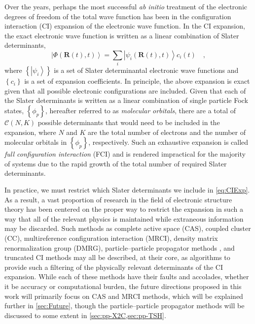 \documentclass[12pt]{article}
\newcommand{\ket}[1]{\left\vert #1 \right\rangle}         %
\newcommand*\vc[1]{\boldsymbol{#1}}
\begin{document}
Over the years, perhaps the most successful \emph{ab initio} treatment of the
electronic degrees of freedom of the total wave function has been in the
configuration interaction (CI) expansion of the electronic wave function. In the
CI expansion, the exact electronic wave function is written as a linear
combination of Slater determinants,
\begin{equation}
\ket{\Phi (\vc{R}(t),t)} = \sum_i  \ket{\psi_i (\vc{R}(t),t)} c_i(t)
\quad ,
\label{eq:CIExp}
\end{equation}
where $\left\lbrace\ket{\psi_i}\right\rbrace$ is a set of Slater determinantal
electronic wave functions and $\left\lbrace c_i \right\rbrace$ is a set of
expansion coefficients.  In principle, the above expansion is exact given that
all possible electronic configurations are included. Given that each of the
Slater determinants is written as a linear combination of single particle Fock
states, $\left\lbrace \phi_p \right\rbrace$, hereafter referred to as
\emph{molecular orbitals}, there are a total of $\mathcal{C}(N,K)$ possible
determinants that would need to be included in the expansion, where $N$ and $K$
are the total number of electrons and the number of molecular orbitals in
$\left\lbrace \phi_p \right\rbrace$, respectively. Such an exhaustive expansion
is called \emph{full configuration interaction} (FCI) and is rendered
impractical for the majority of systems due to the rapid growth of the total
number of required Slater determinants.

In practice, we  must restrict which Slater determinants we include in
\cref{eq:CIExp}. As a result, a vast proportion of research in the field of
electronic structure theory has been centered on the proper way to restrict the
expansion in such a way that all of the relevant physics is maintained while
extraneous information may be discarded. Such methods as complete active space
(CAS), coupled cluster (CC), multireference configuration interaction (MRCI),
density matrix renormalization group (DMRG), particle--particle propagator
methods , and truncated CI methods may all be described, at their core, as
algorithms to provide such a filtering of the physically relevant determinants
of the CI expansion. While each of these methods have their faults and
accolades, whether it be accuracy or computational burden, the future
directions proposed in this work will primarily focus on CAS and MRCI methods,
which will be explained further in \cref{sec:Future}, though the
particle--particle propagator methods will be discussed to some extent in
\cref{sec:pp-X2C,sec:pp-TSH}.
\end{document}
